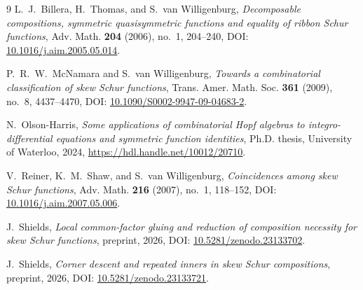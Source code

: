 \documentclass[11pt,a4paper]{amsart}
\numberwithin{equation}{section}
\theoremstyle{plain}
\theoremstyle{definition}
\begin{document}
\begin{thebibliography}{9}
L.~J.~Billera, H.~Thomas, and S.~van Willigenburg,
\emph{Decomposable compositions, symmetric quasisymmetric functions and equality of ribbon Schur functions},
Adv.  Math. \textbf{204} (2006), no.~1, 204--240,
DOI: \href{https://doi.org/10.1016/j.aim.2005.05.014}{10.1016/\allowbreak j.aim.2005.05.014}.

P.~R.~W.~McNamara and S.~van Willigenburg,
\emph{Towards a combinatorial classification of skew Schur functions},
Trans.  Amer.  Math.  Soc. \textbf{361} (2009), no.~8, 4437--4470,
DOI: \href{https://doi.org/10.1090/S0002-9947-09-04683-2}{10.1090/\allowbreak S0002-9947-09-04683-2}.

N.~Olson-Harris,
\emph{Some applications of combinatorial Hopf algebras to integro-differential equations and symmetric function identities},
Ph.D. thesis, University of Waterloo, 2024,
\url{https://hdl.handle.net/10012/20710}.

V.~Reiner, K.~M.~Shaw, and S.~van Willigenburg,
\emph{Coincidences among skew Schur functions},
Adv.  Math. \textbf{216} (2007), no.~1, 118--152,
DOI: \href{https://doi.org/10.1016/j.aim.2007.05.006}{10.1016/\allowbreak j.aim.2007.05.006}.

J.~Shields,
\emph{Local common-factor gluing and reduction of composition necessity for skew Schur functions},
preprint, 2026,
DOI: \href{https://doi.org/10.5281/zenodo.23133702}{10.5281/\allowbreak zenodo.23133702}.

J.~Shields,
\emph{Corner descent and repeated inners in skew Schur compositions},
preprint, 2026,
DOI: \href{https://doi.org/10.5281/zenodo.23133721}{10.5281/\allowbreak zenodo.23133721}.

\end{thebibliography}
\end{document}
